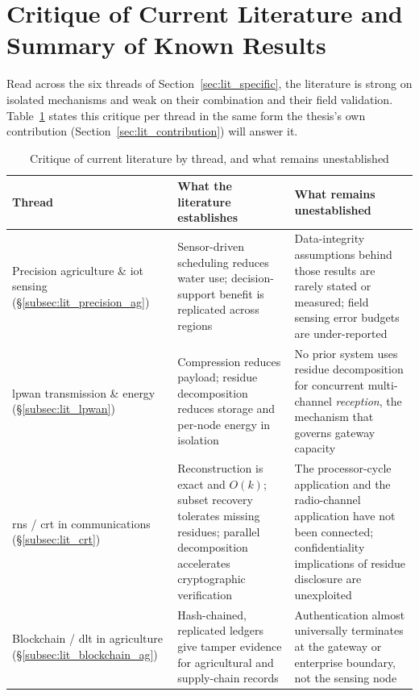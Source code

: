 \documentclass[12pt,a4paper,oneside]{book}
\begin{document}
\section{Critique of Current Literature and Summary of Known Results}
\label{sec:lit_critique}

Read across the six threads of Section~\ref{sec:lit_specific}, the
literature is strong on isolated mechanisms and weak on their combination
and their field validation. Table~\ref{tab:lit-gap-summary} states this
critique per thread in the same form the thesis's own contribution
(Section~\ref{sec:lit_contribution}) will answer it.

\begin{table}[htbp]
\centering
\caption{Critique of current literature by thread, and what remains
         unestablished}
\label{tab:lit-gap-summary}
\footnotesize
\begin{tabularx}{\textwidth}{@{}p{}X X@{}}
\toprule
\textbf{Thread} & \textbf{What the literature establishes} & \textbf{What remains unestablished} \\
\midrule
Precision agriculture \& \gls{iot} sensing (\S\ref{subsec:lit_precision_ag})
  & Sensor-driven scheduling reduces water use; decision-support benefit is
    replicated across regions
  & Data-integrity assumptions behind those results are rarely stated or
    measured; field sensing error budgets are under-reported \\
\midrule
\gls{lpwan} transmission \& energy (\S\ref{subsec:lit_lpwan})
  & Compression reduces payload; residue decomposition reduces storage and
    per-node energy in isolation
  & No prior system uses residue decomposition for concurrent multi-channel
    \emph{reception}, the mechanism that governs gateway capacity \\
\midrule
\gls{rns} / \gls{crt} in communications (\S\ref{subsec:lit_crt})
  & Reconstruction is exact and $O(k)$; subset recovery tolerates missing
    residues; parallel decomposition accelerates cryptographic verification
  & The processor-cycle application and the radio-channel application have
    not been connected; confidentiality implications of residue disclosure
    are unexploited \\
\midrule
Blockchain / \gls{dlt} in agriculture (\S\ref{subsec:lit_blockchain_ag})
  & Hash-chained, replicated ledgers give tamper evidence for agricultural
    and supply-chain records
  & Authentication almost universally terminates at the gateway or
    enterprise boundary, not the sensing node \\

\end{tabularx}
\end{table}
\end{document}
